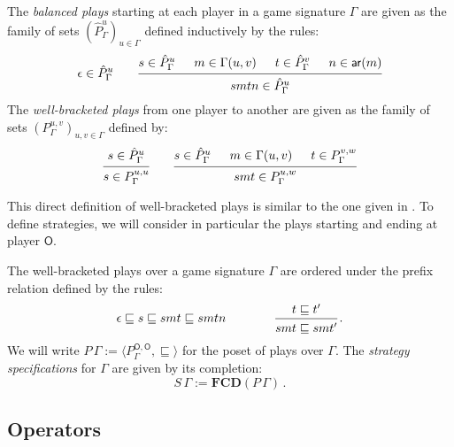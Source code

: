 \documentclass[format=sigplan,authordraft]{acmart}
\newcommand{\kw}[1]{\ensuremath{ \mathsf{#1} }}
\begin{document}
\begin{definition}
The \emph{balanced plays}
starting at each player in
a game signature $\Gamma$
are given
as the family of sets
$(\hat{P}_\Gamma^u)_{u \in \Gamma}$
defined inductively by the rules:
\[
  \epsilon \in \hat{P}_\Gamma^u
  \qquad
  \begin{prooftree}
    \hypo{s \in \hat{P}_\Gamma^u}
    \hypo{m \in \Gamma(u, v)}
    \hypo{t \in \hat{P}_\Gamma^v}
    \hypo{n \in \kw{ar}(m)}
    \infer4{smtn \in \hat{P}_\Gamma^u}
  \end{prooftree}
\]
The \emph{well-bracketed plays}
from one player to another
are given as the family of sets
$(P_\Gamma^{u,v})_{u,v \in \Gamma}$
defined by:
\[
  \begin{prooftree}
    \hypo{s \in \hat{P}_\Gamma^u}
    \infer1{s \in P_\Gamma^{u,u}}
  \end{prooftree}
  \qquad
  \begin{prooftree}
    \hypo{s \in \hat{P}_\Gamma^u}
    \hypo{m \in \Gamma(u, v)}
    \hypo{t \in P_\Gamma^{v,w}}
    \infer3{smt \in P_\Gamma^{u,w}}
  \end{prooftree}
\]
\end{definition}

This direct definition of well-bracketed plays
is similar to the one given in \cite{mwjava}.
To define strategies,
we will consider in particular the plays
starting and ending at player $\kw{O}$.

\begin{definition}
The well-bracketed plays over a game signature $\Gamma$
are ordered under the prefix relation
defined by the rules:
\[
  \epsilon \sqsubseteq s \sqsubseteq smt \sqsubseteq smtn
  \qquad \qquad
  \begin{prooftree}
    \hypo{t \sqsubseteq t'}
    \infer1{smt \sqsubseteq smt'}
  \end{prooftree} \,.
\]
We will write
$P \, \Gamma := \langle P_\Gamma^{\kw{O},\kw{O}}, {\sqsubseteq} \rangle$
for the poset of plays over $\Gamma$.
The \emph{strategy specifications} for $\Gamma$
are given by its completion:
\[
    S \, \Gamma := \mathbf{FCD}(P \, \Gamma) \,.
\]
\end{definition}


\subsection{Operators} %
\end{document}

